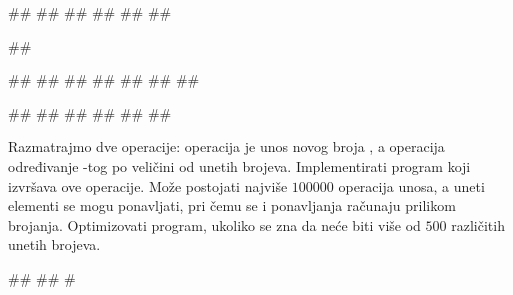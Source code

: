 \begin{Exercise}[label=514]
\begin{minitest}
\begin{test}{2}
#\naslovIzlaz#
##
##
##
##
##
\end{test}
\end{minitest}
\begin{minitest}
\begin{test}{3}
##
  
##
##
##
##
##
##
##

#\naslovIzlaz#
##
##
##
##
##
\end{test}
\end{minitest}

\end{Exercise}

\begin{Answer}[ref=514]
\end{Answer}
\begin{Exercise}[difficulty=2, label=515]
  Razmatrajmo dve operacije: operacija  je unos novog broja
  , a operacija  određivanje -tog po
  veličini od unetih brojeva. Implementirati program koji izvršava ove
  operacije. Može postojati najviše $100000$ operacija unosa, a uneti
  elementi se mogu ponavljati, pri čemu se i ponavljanja računaju
  prilikom brojanja.  Optimizovati program,
  ukoliko se zna da neće biti više od $500$ različitih unetih brojeva.
  
\begin{maxitest}
\begin{upotreba}{1}
#\naslovInt#
##
#
\end{upotreba}
\end{maxitest}
  
\end{Exercise}

